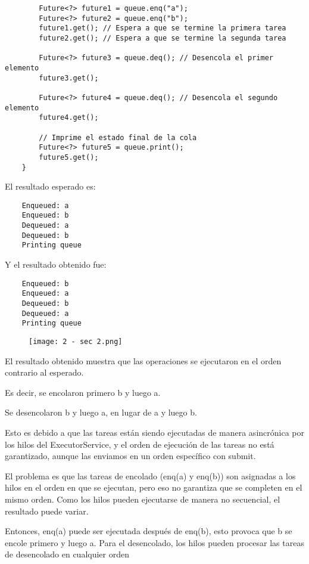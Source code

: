 \begin{enumerate}
\begin{itemize}
\begin{verbatim}
        Future<?> future1 = queue.enq("a");
        Future<?> future2 = queue.enq("b");
        future1.get(); // Espera a que se termine la primera tarea
        future2.get(); // Espera a que se termine la segunda tarea

        Future<?> future3 = queue.deq(); // Desencola el primer elemento
        future3.get();

        Future<?> future4 = queue.deq(); // Desencola el segundo elemento
        future4.get();

        // Imprime el estado final de la cola
        Future<?> future5 = queue.print();
        future5.get();
    }
    \end{verbatim}

    El resultado esperado es:
    \begin{verbatim}
    Enqueued: a
    Enqueued: b
    Dequeued: a
    Dequeued: b
    Printing queue
    \end{verbatim}

    Y el resultado obtenido fue:
    \begin{verbatim}
    Enqueued: b
    Enqueued: a
    Dequeued: b
    Dequeued: a
    Printing queue
    \end{verbatim}

    \begin{figure}[h]
    \centering
    \texttt{[image: 2 - sec 2.png]}
\end{figure}

    El resultado obtenido muestra que las operaciones se ejecutaron en el orden contrario al esperado. 
    
    Es decir, se encolaron primero b y luego a.

    Se desencolaron b y luego a, en lugar de a y luego b.

    Esto es debido a que las tareas están siendo ejecutadas de manera asincrónica por los hilos del ExecutorService, y el orden de ejecución de las tareas no está garantizado, aunque las enviamos en un orden específico con submit.

    El problema es que las tareas de encolado (enq(a) y enq(b)) son asignadas a los hilos en el orden en que se ejecutan, pero eso no garantiza que se completen en el mismo orden. Como los hilos pueden ejecutarse de manera no secuencial, el resultado puede variar.

    Entonces, enq(a) puede ser ejecutada después de enq(b), esto provoca que b se encole primero y luego a. Para el desencolado, los hilos pueden procesar las tareas de desencolado en cualquier orden


\end{itemize}
\end{enumerate}
